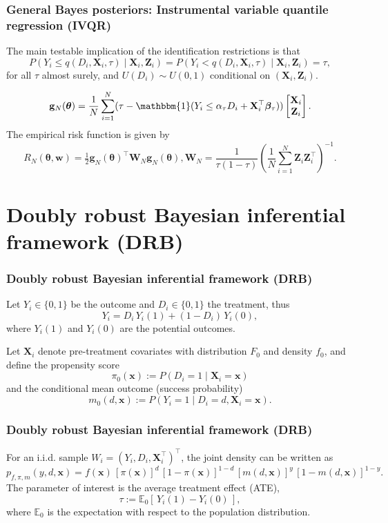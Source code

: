 \documentclass[12pt, compress]{beamer}
\begin{document}
\begin{frame}
	\frametitle{General Bayes posteriors: Instrumental variable quantile regression (IVQR)}
The main testable implication of the identification restrictions is that
\[
P\!\left(Y_i \leq q(D_i,\mathbf{X}_i,\tau)\mid \mathbf{X}_i,\mathbf{Z}_i\right)
= P\!\left(Y_i < q(D_i,\mathbf{X}_i,\tau)\mid \mathbf{X}_i,\mathbf{Z}_i\right)
= \tau,
\]
for all $\tau$ almost surely, and $U(D_i)\sim U(0,1)$ conditional on $(\mathbf{X}_i,\mathbf{Z}_i)$.  

\[
\mathbf{g}_N(\boldsymbol{\theta})=\frac{1}{N}\sum_{i=1}^N (\tau-\mathbbm{1}(Y_i\leq \alpha_{\tau}D_i+\mathbf{X}_i^{\top}\boldsymbol{\beta}_{\tau}))\begin{bmatrix}
\mathbf{X}_i\\
\mathbf{Z}_i
\end{bmatrix}.
\]
The empirical risk function is given by 
\[
R_N(\boldsymbol{\theta},\mathbf{w})=\tfrac{1}{2}\mathbf{g}_N(\boldsymbol{\theta})^{\top}\mathbf{W}_N\mathbf{g}_N(\boldsymbol{\theta}), \mathbf{W}_N=\frac{1}{\tau(1-\tau)}\left(\frac{1}{N}\sum_{i=1}^N \mathbf{Z}_i\mathbf{Z}_i^{\top}\right)^{-1}.
\]
\end{frame}

\section{Doubly robust Bayesian inferential framework (DRB)}

\begin{frame}
	\frametitle{Doubly robust Bayesian inferential framework (DRB)}
Let $Y_i\in\{0,1\}$ be the outcome and $D_i\in\{0,1\}$ the treatment, thus
\[
Y_i = D_i\,Y_i(1) + (1-D_i)\,Y_i(0),
\]
where $Y_i(1)$ and $Y_i(0)$ are the potential outcomes.

Let $\mathbf{X}_i$ denote pre-treatment covariates with distribution $F_0$ and density $f_0$, and define the propensity score
\[
\pi_0(\mathbf{x}) := P(D_i=1\mid \mathbf{X}_i=\mathbf{x})
\]
and the conditional mean outcome (success probability)
\[
m_0(d,\mathbf{x}) := P(Y_i=1\mid D_i=d,\mathbf{X}_i=\mathbf{x}).
\]
\end{frame}

\begin{frame}
	\frametitle{Doubly robust Bayesian inferential framework (DRB)}
For an i.i.d. sample $W_i=(Y_i,D_i,\mathbf{X}_i^{\top})^{\top}$, the joint density can be written as
\[
p_{f,\pi,m}(y,d,\mathbf{x})
= f(\mathbf{x})\,[\pi(\mathbf{x})]^d\,[1-\pi(\mathbf{x})]^{1-d}\,[m(d,\mathbf{x})]^y\,[1-m(d,\mathbf{x})]^{1-y}.
\]
The parameter of interest is the average treatment effect (ATE),
\[
\tau := \mathbb{E}_0\!\left[\,Y_i(1)-Y_i(0)\,\right],
\]
where $\mathbb{E}_0$ is the expectation with respect to the population distribution.

\end{frame}
\end{document}
